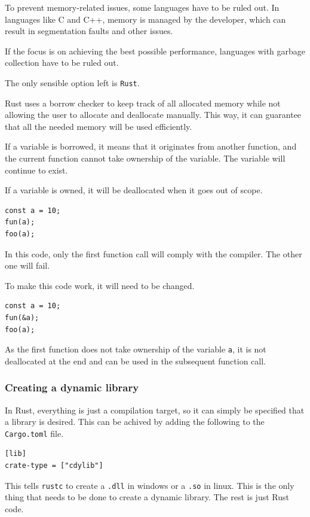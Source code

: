 \documentclass[12pt, letterpaper]{article}
\begin{document}
\begin{multicols}{2}
    To prevent memory-related issues, some languages have to be ruled out. In languages like C and C++, memory is managed by the developer, which can result in segmentation faults and other issues.

    If the focus is on achieving the best possible performance, languages with garbage collection have to be ruled out.

    The only sensible option left is \verb|Rust|.

    Rust uses a borrow checker to keep track of all allocated memory while not allowing the user to allocate and deallocate manually. This way, it can guarantee that all the needed memory will be used efficiently.

    If a variable is borrowed, it means that it originates from another function, and the current function cannot take ownership of the variable. The variable will continue to exist.

    If a variable is owned, it will be deallocated when it goes out of scope.

    \begin{lstlisting}
const a = 10;
fun(a);
foo(a);
    \end{lstlisting}

    In this code, only the first function call will comply with the compiler. The other one will fail.

    To make this code work, it will need to be changed.

    \begin{lstlisting}
const a = 10;
fun(&a);
foo(a);
    \end{lstlisting}

    As the first function does not take ownership of the variable \verb|a|, it is not deallocated at the end and can be used in the subsequent function call.

    \subsubsection{Creating a dynamic library}

    In Rust, everything is just a compilation target, so it can simply be specified that a library is desired. This can be achived by adding the following to the \verb|Cargo.toml| file.

    \begin{lstlisting}
[lib]
crate-type = ["cdylib"]
    \end{lstlisting}

    This tells \verb|rustc| to create a \verb|.dll| in windows or a \verb|.so| in linux. This is the only thing that needs to be done to create a dynamic library. The rest is just Rust code.


\end{multicols}
\end{document}
